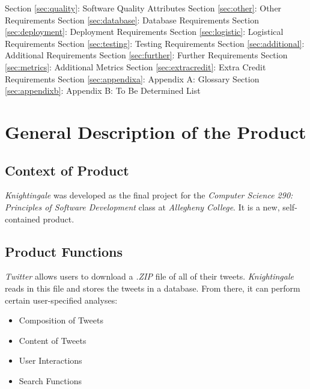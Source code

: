 \documentclass[a4paper, 12pt]{article}
\begin{document}
\begin{adjustwidth}{2em}{0pt}
Section \ref{sec:quality}: Software Quality Attributes \newline
Section \ref{sec:other}: Other Requirements \newline
Section \ref{sec:database}: Database Requirements \newline
Section \ref{sec:deployment}: Deployment Requirements \newline
Section \ref{sec:logistic}: Logistical Requirements \newline
Section \ref{sec:testing}: Testing Requirements \newline
Section \ref{sec:additional}: Additional Requirements \newline
Section \ref{sec:further}: Further Requirements \newline
Section \ref{sec:metrics}: Additional Metrics \newline
Section \ref{sec:extracredit}: Extra Credit Requirements \newline
Section \ref{sec:appendixa}: Appendix A: Glossary \newline
Section \ref{sec:appendixb}: Appendix B: To Be Determined List \newline
\end{adjustwidth}

\section{General Description of the Product} \label{sec:general}
\subsection{Context of Product} \label{sec:context}
\begin{adjustwidth}{2em}{0pt}
\textit{Knightingale} was developed as the final project for the \textit{Computer Science 290: Principles of Software Development} class at \textit{Allegheny College}. It is a new, self-contained product. 
\end{adjustwidth}
 
\subsection{Product Functions} \label{sec:functions}
\begin{adjustwidth}{2em}{0pt}
\textit{Twitter} allows users to download a \textit{.ZIP} file of all of their tweets. \textit{Knightingale} reads in this file and stores the tweets in a database. From there, it can perform certain user-specified analyses:
\begin{itemize}
\item Composition of Tweets
\item Content of Tweets
\item User Interactions
\item Search Functions
\end{itemize}
\end{adjustwidth}
\end{document}
